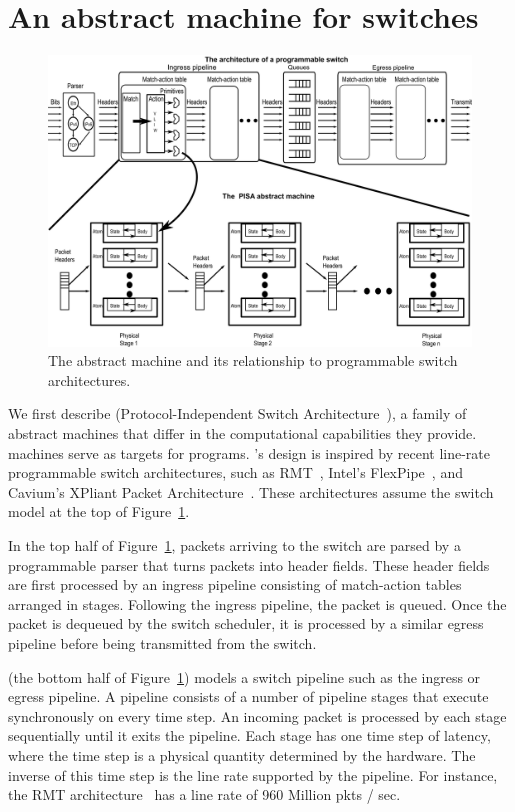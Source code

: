\section{An abstract machine for switches}
\label{s:absmachine}

\begin{figure}[!t]
  \includegraphics[width=\textwidth]{pisa.pdf}
  \caption{The \absmachine abstract machine and its relationship to
  programmable switch architectures.}
  \label{fig:switch}
\end{figure}

We first describe \absmachine (Protocol-Independent Switch
Architecture~\cite{nick_p4}), a family of abstract machines that differ in the
computational capabilities they provide. \absmachine machines serve as targets
for \pktlanguage programs. \absmachine's design is inspired by recent line-rate
programmable switch architectures, such as RMT~\cite{rmt}, Intel's
FlexPipe~\cite{flexpipe}, and Cavium's XPliant Packet Architecture~\cite{xpliant}.  These
architectures assume the switch model at the top of Figure~\ref{fig:switch}.

In the top half of Figure~\ref{fig:switch}, packets arriving to the switch are
parsed by a programmable parser that turns packets into header fields. These
header fields are first processed by an ingress pipeline consisting of
match-action tables arranged in stages.  Following the ingress pipeline, the
packet is queued. Once the packet is dequeued by the switch scheduler, it is
processed by a similar egress pipeline before being transmitted from the switch.

\absmachine (the bottom half of Figure~\ref{fig:switch}) models a switch
pipeline such as the ingress or egress pipeline. A pipeline consists of a
number of pipeline stages that execute synchronously on every time step. An
incoming packet is processed by each stage sequentially until it exits the
pipeline. Each stage has one time step of latency, where the time step
is a physical quantity determined by the hardware. The inverse of this time
step is the line rate supported by the pipeline. For instance, the RMT
architecture~\cite{rmt} has a line rate of 960 Million pkts / sec.

